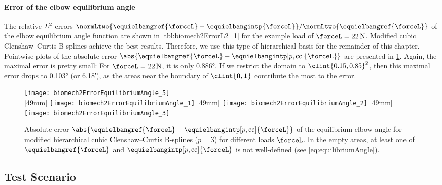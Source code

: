 \paragraph{Error of the elbow equilibrium angle}

The relative $L^2$ errors
$\normLtwo{\equielbangref{\forceL} - \equielbangintp{\forceL}}/
\normLtwo{\equielbangref{\forceL}}$
of the elbow equilibrium angle function are shown in
\cref{tbl:biomech2ErrorL2_1} for the example load of
$\forceL = \SI{22}{\newton}$.
Modified cubic Clenshaw--Curtis B-splines achieve the best results.
Therefore, we use this type of hierarchical basis
for the remainder of this chapter.
Pointwise plots of the absolute error
$\abs{\equielbangref{\forceL} - \equielbangintp[p,\cc]{\forceL}}$
are presented in \cref{fig:biomech2ErrorEquilibriumAngle}.
Again, the maximal error is pretty small:
For $\forceL = \SI{22}{\newton}$, it is only \ang{0.886}.
If we restrict the domain to $\clint{0.15, 0.85}^2$,
then this maximal error drops to \ang{0.103} (or \ang{;6.18;}),
as the areas near the boundary of $\clint{\*0, \*1}$
contribute the most to the error.

\begin{figure}
  \texttt{[image: biomech2ErrorEquilibriumAngle\_5]}%
  \\[2mm]%
  [49mm]{%
    \texttt{[image: biomech2ErrorEquilibriumAngle\_1]}%
  }%
  \hfill%
  [49mm]{%
    \texttt{[image: biomech2ErrorEquilibriumAngle\_2]}%
  }%
  \hfill%
  [49mm]{%
    \texttt{[image: biomech2ErrorEquilibriumAngle\_3]}%
  }%
  \caption[Absolute error of the equilibrium elbow angle]{%
    Absolute error
    $\abs{\equielbangref{\forceL} - \equielbangintp[p,\cc]{\forceL}}$
    of the equilibrium elbow angle for
    modified hierarchical cubic Clenshaw--Curtis B-splines ($p = 3$)
    for different loads $\forceL$.
    In the empty areas, at least one of
    $\equielbangref{\forceL}$ and $\equielbangintp[p,\cc]{\forceL}$
    is not well-defined (see \cref{eq:equilibriumAngle}).%
  }%
  \label{fig:biomech2ErrorEquilibriumAngle}%
\end{figure}



\subsection{Test Scenario}
\label{sec:733scenario}

